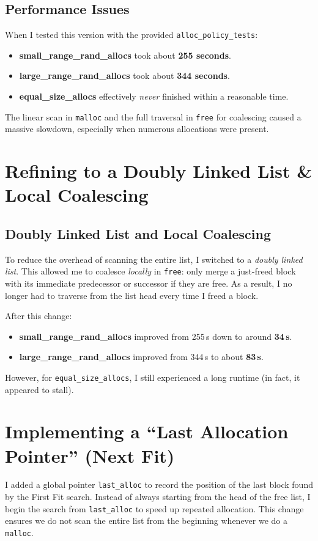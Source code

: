 \documentclass[11pt]{article}
\begin{document}
\subsection{Performance Issues}
When I tested this version with the provided \texttt{alloc\_policy\_tests}:
\begin{itemize}
    \item \textbf{small\_range\_rand\_allocs} took about \textbf{255 seconds}.
    \item \textbf{large\_range\_rand\_allocs} took about \textbf{344 seconds}.
    \item \textbf{equal\_size\_allocs} effectively \emph{never} finished within a reasonable time.
\end{itemize}
The linear scan in \texttt{malloc} and the full traversal in \texttt{free} for coalescing caused a massive slowdown, especially when numerous allocations were present.

\section{Refining to a Doubly Linked List \& Local Coalescing}
\subsection{Doubly Linked List and Local Coalescing}
To reduce the overhead of scanning the entire list, I switched to a \emph{doubly linked list}. This allowed me to coalesce \emph{locally} in \texttt{free}: only merge a just-freed block with its immediate predecessor or successor if they are free. As a result, I no longer had to traverse from the list head every time I freed a block.

After this change:
\begin{itemize}
    \item \textbf{small\_range\_rand\_allocs} improved from 255\,s down to around \textbf{34\,s}.
    \item \textbf{large\_range\_rand\_allocs} improved from 344\,s to about \textbf{83\,s}.
\end{itemize}
However, for \texttt{equal\_size\_allocs}, I still experienced a long runtime (in fact, it appeared to stall).

\section{Implementing a ``Last Allocation Pointer'' (Next Fit)}
I added a global pointer \texttt{last\_alloc} to record the position of the last block found by the First Fit search. Instead of always starting from the head of the free list, I begin the search from \texttt{last\_alloc} to speed up repeated allocation. This change ensures we do not scan the entire list from the beginning whenever we do a \texttt{malloc}.
\end{document}
